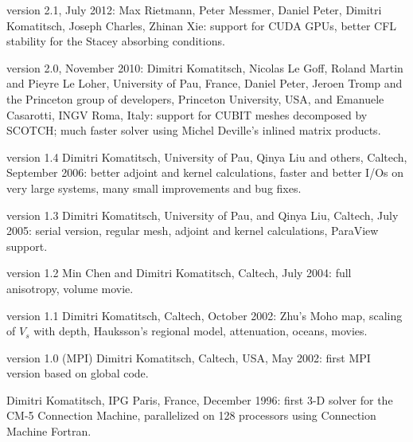 version 2.1, July 2012: Max Rietmann, Peter Messmer, Daniel Peter, Dimitri
Komatitsch, Joseph Charles, Zhinan Xie: support for CUDA GPUs, better
CFL stability for the Stacey absorbing conditions. \newline


version 2.0, November 2010: Dimitri Komatitsch, Nicolas Le Goff, Roland
Martin and Pieyre Le Loher, University of Pau, France, Daniel Peter,
Jeroen Tromp and the Princeton group of developers, Princeton University,
USA, and Emanuele Casarotti, INGV Roma, Italy: support for CUBIT meshes
decomposed by SCOTCH; much faster solver using Michel Deville's inlined
matrix products.\newline


version 1.4 Dimitri Komatitsch, University of Pau, Qinya Liu and others,
Caltech, September 2006: better adjoint and kernel calculations, faster
and better I/Os on very large systems, many small improvements and
bug fixes.\newline


version 1.3 Dimitri Komatitsch, University of Pau, and Qinya Liu, Caltech,
July 2005: serial version, regular mesh, adjoint and kernel calculations,
ParaView support.\newline


version 1.2 Min Chen and Dimitri Komatitsch, Caltech, July 2004: full
anisotropy, volume movie.\newline


version 1.1 Dimitri Komatitsch, Caltech, October 2002: Zhu's Moho map,
scaling of $V_{s}$ with depth, Hauksson's regional model, attenuation,
oceans, movies.\newline


version 1.0 (MPI) Dimitri Komatitsch, Caltech, USA, May 2002: first MPI version
based on global code.\newline


Dimitri Komatitsch, IPG Paris, France, December 1996: first 3-D solver
for the CM-5 Connection Machine, parallelized on 128 processors using
Connection Machine Fortran.\newline

